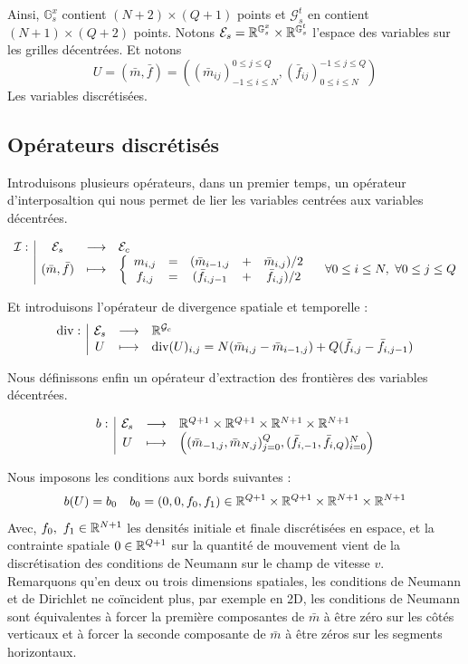 \documentclass[a4paper,12pt]{article}
\renewcommand{\div}{\text{div}}
\begin{document}
Ainsi, $\mathbb{G}_s^x$ contient $(N+2)\times(Q+1)$ points et $\mathcal{G}_s^t$ en contient $(N+1)\times(Q+2)$ points. Notons $\mathcal{E}_s=\mathbb{R}^{\mathbb{G}_s^x}\times\mathbb{R}^{\mathbb{G}_s^t}$ l'espace des variables sur les grilles décentrées. Et notons 
$$
U=(\bar{m},\bar{f})=\left((\bar{m}_{ij})_{-1\leq i\leq N}^{0\leq j\leq Q}, (\bar{f}_{ij})_{0\leq i\leq N}^{-1\leq j\leq Q}\right)
$$
Les variables discrétisées. 

\subsection{Opérateurs discrétisés}
Introduisons plusieurs opérateurs, dans un premier temps, un opérateur d'interposaltion qui nous permet de lier les variables centrées aux variables décentrées. 

\begin{align}
\begin{array}[t]{l|ccl} \mathcal{I}: & \mathcal{E}_s & \longrightarrow & \mathcal{E}_c \\ & (\bar{m},\bar{f}) & \longmapsto & \left\{
\begin{array}{ccccc}
m_{i,j} &=& (\bar{m}_{i-1,j} &+& \bar{m}_{i,j})/2 \\
f_{i,j} &=& (\bar{f}_{i,j-1} &+& \bar{f}_{i,j})/2 \\
\end{array}
\right.
\quad \forall 0\leq i\leq N,\ \forall 0\leq j\leq Q \end{array}
\end{align}

Et introduisons l'opérateur de divergence spatiale et temporelle : 
\begin{align}
\fonction{\div}{\mathcal{E}_s}{\RR^{\mathcal{G}_c}}{U}{\div(U)_{i,j} = N(\bar{m}_{i,j} - \bar{m}_{i-1,j}) + Q(\bar{f}_{i,j} - \bar{f}_{i,j-1})
}
\end{align}

Nous définissons enfin un opérateur d'extraction des frontières des variables décentrées. 

\begin{align}
\begin{array}[t]{l|ccl} b: & \mathcal{E}_s & \longrightarrow & \mathbb{R}^{Q+1}\times\mathbb{R}^{Q+1}\times\mathbb{R}^{N+1}\times\mathbb{R}^{N+1} \\ & U & \longmapsto & \left( (\bar{m}_{-1,j},\bar{m}_{N,j})_{j=0}^Q,(\bar{f}_{i,-1},\bar{f}_{i,Q})_{i=0}^N \right) \end{array}
\end{align}


Nous imposons les conditions aux bords suivantes :
$$
b(U) = b_0\quad b_0=(0,0,f_0,f_1)\in \mathbb{R}^{Q+1}\times\mathbb{R}^{Q+1}\times\mathbb{R}^{N+1}\times\mathbb{R}^{N+1}
$$
Avec, $f_0,\ f_1\in\mathbb{R}^{N+1}$ les densités initiale et finale discrétisées en espace, et la contrainte spatiale $0\in\mathbb{R}^{Q+1}$ sur la quantité de mouvement vient de la discrétisation des conditions de Neumann sur le champ de vitesse $v$. \\
Remarquons qu'en deux ou trois dimensions spatiales, les conditions de Neumann et de Dirichlet ne coïncident plus,  par exemple en 2D, les conditions de Neumann sont équivalentes à forcer la première composantes de $\bar{m}$ à être zéro sur les côtés verticaux et à forcer la seconde composante de $\bar{m}$ à être zéros sur les segments horizontaux. 
\end{document}
